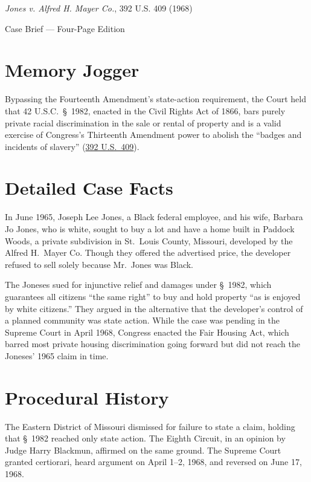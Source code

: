 \documentclass[12pt]{article}
\begin{document}
\begin{center}
{\LARGE \textit{Jones v. Alfred H. Mayer Co.}, 392 U.S. 409 (1968)\par}
\vspace{0.8em}
{\large Case Brief --- Four-Page Edition\par}
\end{center}
\vspace{1em}

\section{Memory Jogger}

Bypassing the Fourteenth Amendment's state-action requirement, the Court held that 42 U.S.C.\ \S\ 1982, enacted in the Civil Rights Act of 1866, bars purely private racial discrimination in the sale or rental of property and is a valid exercise of Congress's Thirteenth Amendment power to abolish the ``badges and incidents of slavery'' (\href{https://supreme.justia.com/cases/federal/us/392/409/}{392 U.S.\ 409}).

\section{Detailed Case Facts}

In June 1965, Joseph Lee Jones, a Black federal employee, and his wife, Barbara Jo Jones, who is white, sought to buy a lot and have a home built in Paddock Woods, a private subdivision in St.\ Louis County, Missouri, developed by the Alfred H.\ Mayer Co. Though they offered the advertised price, the developer refused to sell solely because Mr.\ Jones was Black.

The Joneses sued for injunctive relief and damages under \S\ 1982, which guarantees all citizens ``the same right'' to buy and hold property ``as is enjoyed by white citizens.'' They argued in the alternative that the developer's control of a planned community was state action. While the case was pending in the Supreme Court in April 1968, Congress enacted the Fair Housing Act, which barred most private housing discrimination going forward but did not reach the Joneses' 1965 claim in time.

\section{Procedural History}

The Eastern District of Missouri dismissed for failure to state a claim, holding that \S\ 1982 reached only state action. The Eighth Circuit, in an opinion by Judge Harry Blackmun, affirmed on the same ground. The Supreme Court granted certiorari, heard argument on April 1--2, 1968, and reversed on June 17, 1968.
\end{document}

